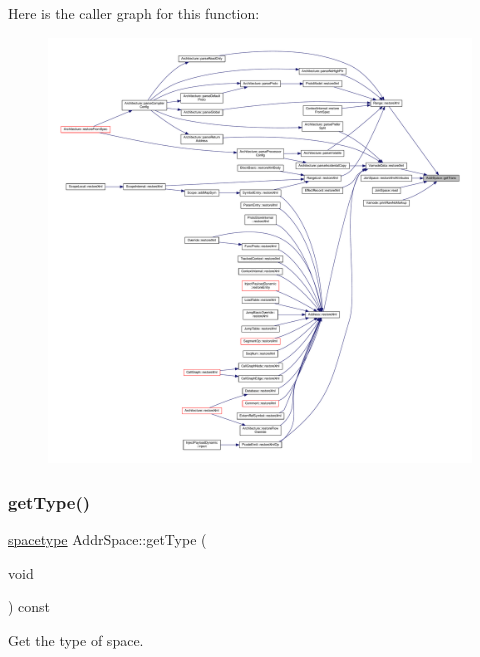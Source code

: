 Here is the caller graph for this function\+:
\nopagebreak
\begin{figure}[H]
\begin{center}
\leavevmode
\includegraphics[width=350pt]{class_addr_space_a3a0cdcba6345332bd0f557a449de6948_icgraph}
\end{center}
\end{figure}
\mbox{\label{class_addr_space_ab548f4158529a29122d4d0a30d94ed98}} 
\subsubsection{\texorpdfstring{getType()}{getType()}}
{\footnotesize\ttfamily \mbox{\hyperlink{space_8hh_a1a83535cca68b7ca3f25bfad70262231}{spacetype}} Addr\+Space\+::get\+Type (\begin{DoxyParamCaption}\item[{void}]{ }\end{DoxyParamCaption}) const\hspace{0.3cm}{\ttfamily [inline]}}



Get the type of space. 

